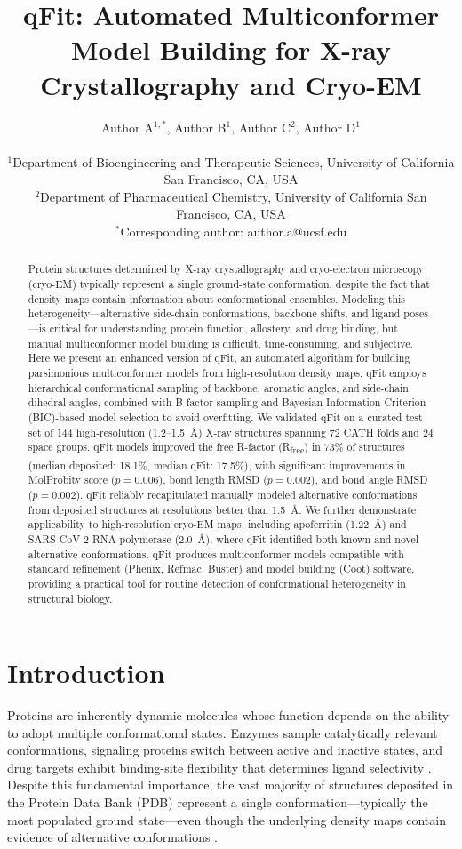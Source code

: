 \documentclass[12pt]{article}
\title{qFit: Automated Multiconformer Model Building for X-ray Crystallography and Cryo-EM}
\author{Author A$^{1,*}$, Author B$^{1}$, Author C$^{2}$, Author D$^{1}$ \\
\\
\small $^{1}$Department of Bioengineering and Therapeutic Sciences, University of California San Francisco, CA, USA \\
\small $^{2}$Department of Pharmaceutical Chemistry, University of California San Francisco, CA, USA \\
\small $^{*}$Corresponding author: author.a@ucsf.edu}
\date{}
\begin{document}
\maketitle

\begin{abstract}
Protein structures determined by X-ray crystallography and cryo-electron microscopy (cryo-EM) typically represent a single ground-state conformation, despite the fact that density maps contain information about conformational ensembles. Modeling this heterogeneity---alternative side-chain conformations, backbone shifts, and ligand poses---is critical for understanding protein function, allostery, and drug binding, but manual multiconformer model building is difficult, time-consuming, and subjective. Here we present an enhanced version of qFit, an automated algorithm for building parsimonious multiconformer models from high-resolution density maps. qFit employs hierarchical conformational sampling of backbone, aromatic angles, and side-chain dihedral angles, combined with B-factor sampling and Bayesian Information Criterion (BIC)-based model selection to avoid overfitting. We validated qFit on a curated test set of 144 high-resolution (1.2--1.5~\AA) X-ray structures spanning 72 CATH folds and 24 space groups. qFit models improved the free R-factor (R\textsubscript{free}) in 73\% of structures (median deposited: 18.1\%, median qFit: 17.5\%), with significant improvements in MolProbity score ($p = 0.006$), bond length RMSD ($p = 0.002$), and bond angle RMSD ($p = 0.002$). qFit reliably recapitulated manually modeled alternative conformations from deposited structures at resolutions better than 1.5~\AA. We further demonstrate applicability to high-resolution cryo-EM maps, including apoferritin (1.22~\AA) and SARS-CoV-2 RNA polymerase (2.0~\AA), where qFit identified both known and novel alternative conformations. qFit produces multiconformer models compatible with standard refinement (Phenix, Refmac, Buster) and model building (Coot) software, providing a practical tool for routine detection of conformational heterogeneity in structural biology.
\end{abstract}

\section{Introduction}

Proteins are inherently dynamic molecules whose function depends on the ability to adopt multiple conformational states. Enzymes sample catalytically relevant conformations, signaling proteins switch between active and inactive states, and drug targets exhibit binding-site flexibility that determines ligand selectivity \citep{fraser2011hidden, keedy2015mapping, vandenbedem2015integrative}. Despite this fundamental importance, the vast majority of structures deposited in the Protein Data Bank (PDB) represent a single conformation---typically the most populated ground state---even though the underlying density maps contain evidence of alternative conformations \citep{burnley2012modelling, lang2014automated}.
\end{document}
